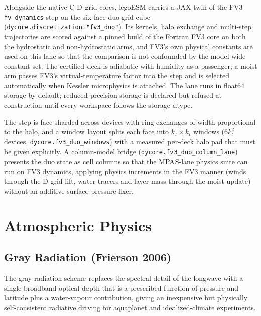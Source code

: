 \documentclass[11pt,a4paper]{article}
\begin{document}
Alongside the native C-D grid cores, legoESM carries a JAX twin of the FV3 \texttt{fv\_dynamics} step on the six-face duo-grid cube \citep{Mouallem2023} (\texttt{dycore.discretization="fv3\_duo"}).  Its kernels, halo exchange and multi-step trajectories are scored against a pinned build of the Fortran FV3 core on both the hydrostatic and non-hydrostatic arms, and FV3's own physical constants are used on this lane so that the comparison is not confounded by the model-wide constant set.  The certified deck is adiabatic with humidity as a passenger; a moist arm passes FV3's virtual-temperature factor into the step and is selected automatically when Kessler microphysics is attached.  The lane runs in float64 storage by default; reduced-precision storage is declared but refused at construction until every workspace follows the storage dtype.

The step is face-sharded across devices with ring exchanges of width proportional to the halo, and a window layout splits each face into $k_t\times k_t$ windows ($6k_t^2$ devices, \texttt{dycore.fv3\_duo\_windows}) with a measured per-deck halo pad that must be given explicitly.  A column-model bridge (\texttt{dycore.fv3\_duo\_column\_lane}) presents the duo state as cell columns so that the MPAS-lane physics suite can run on FV3 dynamics, applying physics increments in the FV3 manner (winds through the D-grid lift, water tracers and layer mass through the moist update) without an additive surface-pressure fixer.

\section{Atmospheric Physics}

\subsection{Gray Radiation (Frierson 2006)}

The gray-radiation scheme \citep{Frierson2006} replaces the spectral
detail of the longwave with a single broadband optical depth that is a
prescribed function of pressure and latitude plus a water-vapour
contribution, giving an inexpensive but physically self-consistent
radiative driving for aquaplanet and idealized-climate experiments.
\end{document}
